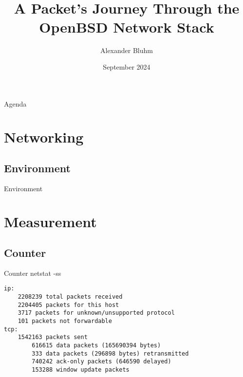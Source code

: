 \documentclass[14pt]{beamer}
\author{Alexander Bluhm}
\title{A Packet's Journey Through the OpenBSD Network Stack}
\institute{genua GmbH\\ \url{bluhm@genua.de}\\ \url{bluhm@openbsd.org}}
\date{September 2024}
\begin{document}
\begin{frame}
\titlepage
\end{frame}

\begin{frame}{Agenda}
\setcounter{tocdepth}{1}
\tableofcontents
\end{frame}

\section{Networking}

\subsection{Environment}
\begin{frame}{Environment}
\end{frame}

\section{Measurement}

\subsection{Counter}
\begin{frame}[fragile]{Counter}
netstat -ss
\scriptsize
\begin{verbatim}
ip:
    2208239 total packets received
    2204405 packets for this host
    3717 packets for unknown/unsupported protocol
    101 packets not forwardable
tcp:
    1542163 packets sent
        616615 data packets (165690394 bytes)
        333 data packets (296898 bytes) retransmitted
        740242 ack-only packets (646590 delayed)
        153288 window update packets
\end{verbatim}
\end{frame}
\end{document}
